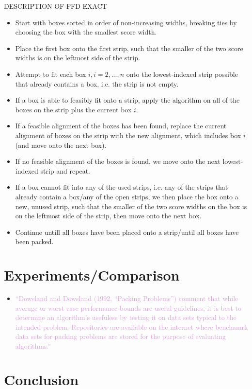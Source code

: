 \documentclass{llncs}
\begin{document}
DESCRIPTION OF FFD EXACT
\begin{itemize}
	\item Start with boxes sorted in order of non-increasing widths, breaking ties by choosing the box with the smallest score width.
	\item Place the first box onto the first strip, such that the smaller of the two score widths is on the leftmost side of the strip.
	\item Attempt to fit each box $i, i = 2,..., n$ onto the lowest-indexed strip possible that already contains a box, i.e. the strip is not empty.
	\item If a box is able to feasibly fit onto a strip, apply the \textcolor{OliveGreen}{algorithm} on all of the boxes on the strip plus the current box $i$.
	\item If a feasible alignment of the boxes has been found, replace the current alignment of boxes on the strip with the new alignment, which includes box $i$ (and move onto the next box).
	\item If no feasible alignment of the boxes is found, we move onto the next lowest-indexed strip and repeat.
	\item If a box cannot fit into any of the used strips, i.e. any of the strips that already contain a box/any of the open strips, we then place the box onto a new, unused strip, such that the smaller of the two score widths on the box is on the leftmost side of the strip, then move onto the next box.
	\item Continue untill all boxes have been placed onto a strip/until all boxes have been packed.
\end{itemize}


\section{Experiments/Comparison}
\begin{itemize}
	\item \textcolor{Plum}{``Dowsland and Dowsland (1992, ``Packing Problems'') comment that while average or worst-case performance bounds are useful guidelines, it is best to determine an algorithm's usefuless by testing it on data sets typical to the intended problem. Repositories are available on the internet where benchamrk data sets for packing problems are stored for the purpose of evaluating algorithms.''}
\end{itemize}


\section{Conclusion}
\end{document}

